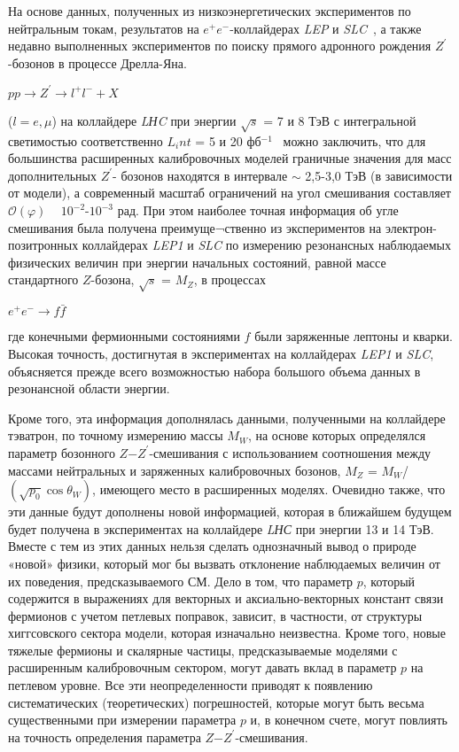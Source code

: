 На основе данных, полученных из низкоэнергетических экспериментов по нейтральным токам, результатов на $e^+e^-$-коллайдерах \textit{LEP} и \textit{SLC}~\cite{Bobovnikov:2016}, а также недавно выполненных экспериментов по поиску прямого адронного рождения $Z^\prime$-бозонов в процессе Дрелла-Яна.
\begin{center}
	$pp \rightarrow Z^\prime \rightarrow l^+l^- + X$
\end{center}
($l=e,\mu$) на коллайдере \textit{LНC} при энергии $\sqrt{s}$ = 7 и 8 ТэВ с интегральной светимостью соответственно $L_int$ = 5 и 20 фб${}^{-1}$~\cite{Bobovnikov:2016} можно заключить, что для большинства расширенных калибровочных моделей граничные значения для масс дополнительных $Z^\prime$- бозонов находятся в интервале $\sim$ 2,5-3,0 ТэВ (в зависимости от модели), а современный масштаб ограничений на угол смешивания составляет $\mathcal{O}(\varphi )$ ~ ${10}^{-2}$-${10}^{-3}$ рад. При этом наиболее точная информация об угле смешивания была получена преимуще¬ственно из экспериментов на электрон-позитронных коллайдерах \textit{LEP1} и \textit{SLC} по измерению резонансных наблюдаемых физических величин при энергии начальных состояний, равной массе стандартного $Z$-бозона, $\sqrt{s}$ = $M_Z$, в процессах\\
\begin{center}
	$e^+e^- \rightarrow f\bar{f}$
\end{center}

где конечными фермионными состояниями $f$ были заряженные лептоны и кварки. Высокая точность, достигнутая в экспериментах на коллайдерах \textit{LEP1} и \textit{SLC}, объясняется прежде всего возможностью набора большого объема данных в резонансной области энергии.

Кроме того, эта информация дополнялась данными, полученными на коллайдере тэватрон, по точному измерению массы $M_W$, на основе которых определялся параметр бозонного $Z$−$Z^\prime$-смешивания с использованием соотношения между массами нейтральных и заряженных калибровочных бозонов, $M_Z$ = $M_W$/$(\sqrt{p_0}\cos\theta_W)$, имеющего место в расширенных моделях. Очевидно также, что эти данные будут дополнены новой информацией, которая в ближайшем будущем будет получена в экспериментах на коллайдере \textit{LНС} при энергии 13 и 14 ТэВ. Вместе с тем из этих данных нельзя сделать однозначный вывод о природе «новой» физики, который мог бы вызвать отклонение наблюдаемых величин от их поведения, предсказываемого СМ. Дело в том, что параметр $p$, который содержится в выражениях для векторных и аксиально-векторных констант связи фермионов с учетом петлевых поправок, зависит, в частности, от структуры хиггсовского сектора модели, которая изначально неизвестна. Кроме того, новые тяжелые фермионы и скалярные частицы, предсказываемые моделями с расширенным калибровочным сектором, могут давать вклад в параметр $p$ на петлевом уровне. Все эти неопределенности приводят к появлению систематических (теоретических) погрешностей, которые могут быть весьма существенными при измерении параметра $p$ и, в конечном счете, могут повлиять на точность определения параметра $Z$−$Z^\prime$-смешивания.

